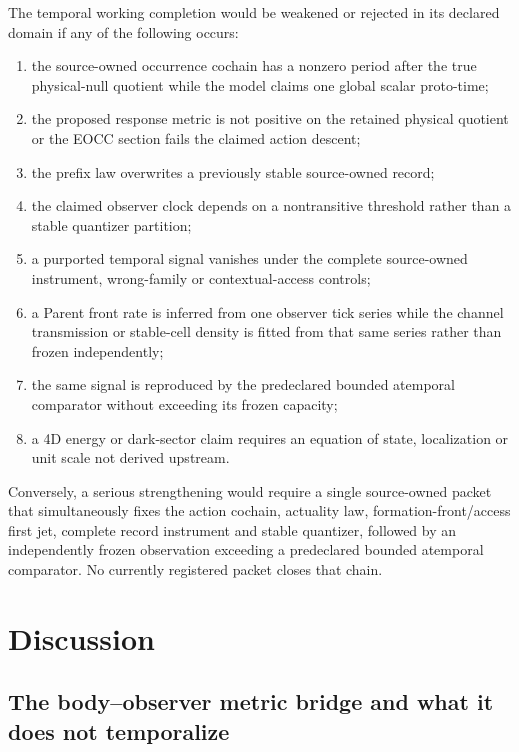 \documentclass[11pt]{article}
\begin{document}
The temporal working completion would be weakened or rejected in its declared
domain if any of the following occurs:
\begin{enumerate}[label=(F\arabic*)]
\item the source-owned occurrence cochain has a nonzero period after the true
      physical-null quotient while the model claims one global scalar
      proto-time;
\item the proposed response metric is not positive on the retained physical
      quotient or the EOCC section fails the claimed action descent;
\item the prefix law overwrites a previously stable source-owned record;
\item the claimed observer clock depends on a nontransitive threshold rather
      than a stable quantizer partition;
\item a purported temporal signal vanishes under the complete source-owned
      instrument, wrong-family or contextual-access controls;
\item a Parent front rate is inferred from one observer tick series while the
      channel transmission or stable-cell density is fitted from that same
      series rather than frozen independently;
\item the same signal is reproduced by the predeclared bounded atemporal
      comparator without exceeding its frozen capacity;
\item a 4D energy or dark-sector claim requires an equation of state,
      localization or unit scale not derived upstream.
\end{enumerate}

Conversely, a serious strengthening would require a single source-owned
packet that simultaneously fixes the action cochain, actuality law,
formation-front/access first jet, complete record instrument and stable
quantizer, followed by an independently frozen observation exceeding a
predeclared bounded atemporal comparator.  No currently registered packet
closes that chain.

\section{Discussion}

\subsection{The body--observer metric bridge and what it does not temporalize}
\end{document}
